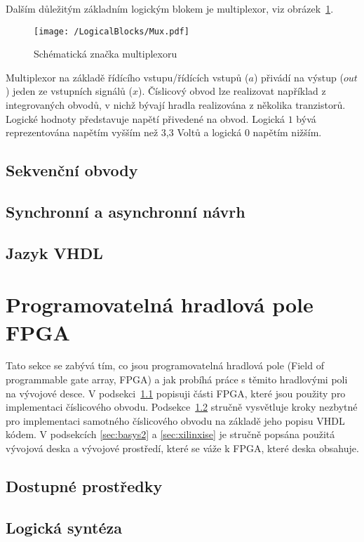 \documentclass{report}
\begin{document}
Dalším důležitým základním logickým blokem je multiplexor, viz obrázek~\ref{fig:mux}.
\begin{figure}
\centering
\texttt{[image: /LogicalBlocks/Mux.pdf]}
\caption{Schématická značka multiplexoru}
\label{fig:mux}
\end{figure}
Multiplexor na základě řídícího vstupu/řídících vstupů ($a$) přivádí na výstup ($out$) jeden ze vstupních signálů ($x$). Číslicový obvod lze realizovat například z integrovaných obvodů, v nichž bývají hradla realizována z několika tranzistorů. Logické hodnoty představuje napětí přivedené na obvod. Logická $1$ bývá reprezentována  napětím vyšším než 3,3 Voltů a logická $0$ napětím nižším.

\subsection{Sekvenční obvody}\label{sec:sekvencniobvody}
\subsection{Synchronní a asynchronní návrh}\label{sec:synchronniaasynchronninavrh}
\subsection{Jazyk VHDL}\label{sec:jazykvhdl}

\section{Programovatelná hradlová pole FPGA}\label{sec:fpga}
Tato sekce se zabývá tím, co jsou programovatelná hradlová pole (Field of programmable gate array, FPGA) a jak probíhá práce s těmito hradlovými poli na vývojové desce. V podsekci~\ref{sec:dostupneprostredky} popisuji části FPGA, které jsou použity pro implementaci číslicového obvodu. Podsekce~\ref{sec:logickasynteza} stručně vysvětluje kroky nezbytné pro implementaci samotného číslicového obvodu na základě jeho popisu VHDL kódem. V podsekcích \ref{sec:basys2} a \ref{sec:xilinxise} je stručně popsána použitá vývojová deska a vývojové prostředí, které se váže k FPGA, které deska obsahuje.

\subsection{Dostupné prostředky}\label{sec:dostupneprostredky}
\subsection{Logická syntéza}\label{sec:logickasynteza}
\end{document}
